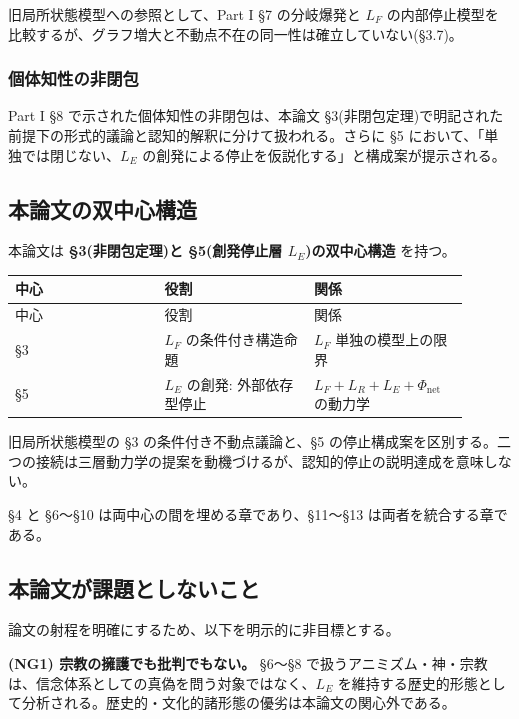 旧局所状態模型への参照として、Part I \S{}7 の分岐爆発と $L_F$ の内部停止模型を比較するが、グラフ増大と不動点不在の同一性は確立していない(\S{}3.7)。

\subsubsection{個体知性の非閉包}


Part I \S{}8 で示された個体知性の非閉包は、本論文 \S{}3(非閉包定理)で明記された前提下の形式的議論と認知的解釈に分けて扱われる。さらに \S{}5 において、「単独では閉じない、$L_E$ の創発による停止を仮説化する」と構成案が提示される。

\bigskip


\subsection{本論文の双中心構造}


本論文は \textbf{\S{}3(非閉包定理)と \S{}5(創発停止層 $L_E$)の双中心構造} を持つ。

\begin{longtable}{@{}p{0.30\linewidth}p{0.30\linewidth}p{0.30\linewidth}@{}}
\toprule
中心 & 役割 & 関係 \\
\midrule
\endfirsthead
\toprule
中心 & 役割 & 関係 \\
\midrule
\endhead
\S{}3 & $L_F$ の条件付き構造命題 & $L_F$ 単独の模型上の限界 \\
\S{}5 & $L_E$ の創発: 外部依存型停止 & $L_F + L_R + L_E + \Phi_{\text{net}}$ の動力学 \\
\bottomrule
\end{longtable}


旧局所状態模型の \S{}3 の条件付き不動点議論と、\S{}5 の停止構成案を区別する。二つの接続は三層動力学の提案を動機づけるが、認知的停止の説明達成を意味しない。

\S{}4 と \S{}6〜\S{}10 は両中心の間を埋める章であり、\S{}11〜\S{}13 は両者を統合する章である。

\bigskip


\subsection{本論文が課題としないこと}


論文の射程を明確にするため、以下を明示的に非目標とする。

\textbf{(NG1) 宗教の擁護でも批判でもない。}
\S{}6〜\S{}8 で扱うアニミズム・神・宗教は、信念体系としての真偽を問う対象ではなく、$L_E$ を維持する歴史的形態として分析される。歴史的・文化的諸形態の優劣は本論文の関心外である。

